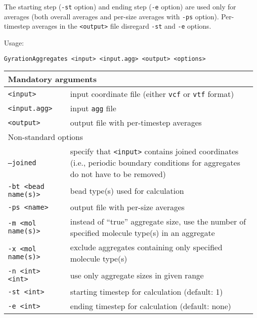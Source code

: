 The starting step (\texttt{-st} option) and ending step (\texttt{-e}
option) are used only for averages (both overall averages and per-size
averages with \texttt{-ps} option). Per-timestep averages in the
\texttt{<output>} file disregard \texttt{-st} and \texttt{-e} options.

Usage:

\vspace{1em}
\noindent
\texttt{GyrationAggregates <input> <input.agg> <output> <options>}

\noindent
\begin{longtable}{p{}p{}}
  \toprule
  \multicolumn{2}{l}{Mandatory arguments} \\
  \midrule
  \texttt{<input>} & input coordinate file (either \texttt{vcf} or
    \texttt{vtf} format) \\
  \texttt{<input.agg>} & input \texttt{agg} file \\
  \texttt{<output>} & output file with per-timestep averages \\
  \toprule
  \multicolumn{2}{l}{Non-standard options} \\
  \midrule
  \texttt{--joined} & specify that \texttt{<input>} contains joined
    coordinates (i.e., periodic boundary conditions for aggregates do not
    have to be removed) \\
  \texttt{-bt <bead name(s)>} & bead type(s) used for calculation \\
  \texttt{-ps <name>} & output file with per-size averages \\
  \texttt{-m <mol name(s)>} & instead of \enquote{true} aggregate size, use
    the number of specified molecule type(s) in an aggregate \\
  \texttt{-x <mol name(s)>} & exclude aggregates containing only specified
    molecule type(s) \\
  \texttt{-n <int> <int>} & use only aggregate sizes in given range \\
  \texttt{-st <int>} & starting timestep for calculation (default: 1) \\
  \texttt{-e <int>} & ending timestep for calculation (default: none) \\
  \bottomrule
\end{longtable}

